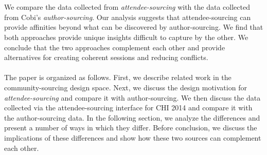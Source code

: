 \documentclass[letterpaper]{article}
\begin{document}
\\
\\
We compare the data collected from \emph{attendee-sourcing} with the data collected from Cobi's \emph{author-sourcing}. Our analysis suggests that attendee-sourcing can provide affinities beyond what can be discovered by author-sourcing. We find that both approaches provide unique insights difficult to capture by the other. We conclude that the two approaches complement each other and provide alternatives for creating coherent sessions and reducing conflicts.
\\
\\
The paper is organized as follows. First, we describe related work in the community-sourcing design space. Next, we discuss the design motivation for \emph{attendee-sourcing} and compare it with author-sourcing. We then discuss the data collected via the attendee-sourcing interface for CHI 2014 and compare it with the author-sourcing data. In the following section, we analyze the differences and present a number of ways in which they differ. Before conclusion, we discuss the implications of these differences and show how these two sources can complement each other.
\end{document}
